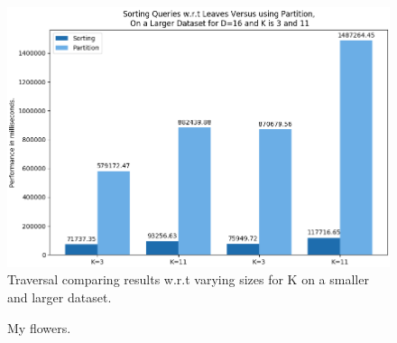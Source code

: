 \begin{figure}[H]
\centering
\includegraphics[width=1\textwidth]{pics/plot-figs/sort-d16.png}
\caption{Traversal comparing results w.r.t varying sizes for K on a smaller and larger dataset.}
\end{figure}

\begin{figure}[!tbp]
  \centering
  \caption{My flowers.}
\end{figure}


